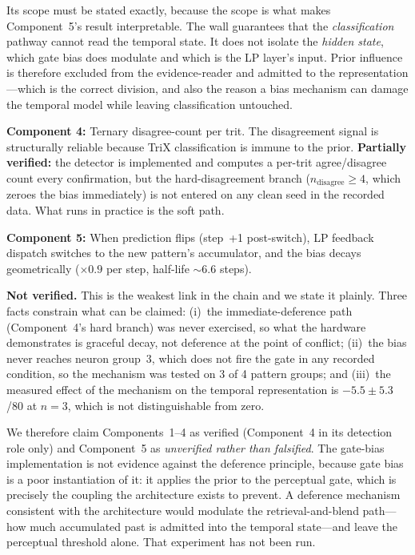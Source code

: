 \documentclass[11pt,letterpaper]{article}
\begin{document}
Its scope must be stated exactly, because the scope is what makes Component~5's result interpretable. The wall guarantees that the \emph{classification} pathway cannot read the temporal state. It does not isolate the \emph{hidden state}, which gate bias does modulate and which is the LP layer's input. Prior influence is therefore excluded from the evidence-reader and admitted to the representation---which is the correct division, and also the reason a bias mechanism can damage the temporal model while leaving classification untouched.

\textbf{Component 4:} Ternary disagree-count per trit. The disagreement signal is structurally reliable because TriX classification is immune to the prior. \textbf{Partially verified:} the detector is implemented and computes a per-trit agree/disagree count every confirmation, but the hard-disagreement branch ($n_{\text{disagree}} \ge 4$, which zeroes the bias immediately) is not entered on any clean seed in the recorded data. What runs in practice is the soft path.

\textbf{Component 5:} When prediction flips (step~+1 post-switch), LP feedback dispatch switches to the new pattern's accumulator, and the bias decays geometrically ($\times 0.9$ per step, half-life $\sim$6.6 steps).

\textbf{Not verified.} This is the weakest link in the chain and we state it plainly. Three facts constrain what can be claimed: (i)~the immediate-deference path (Component~4's hard branch) was never exercised, so what the hardware demonstrates is graceful decay, not deference at the point of conflict; (ii)~the bias never reaches neuron group~3, which does not fire the gate in any recorded condition, so the mechanism was tested on 3 of 4 pattern groups; and (iii)~the measured effect of the mechanism on the temporal representation is $-5.5 \pm 5.3$/80 at $n=3$, which is not distinguishable from zero.

We therefore claim Components~1--4 as verified (Component~4 in its detection role only) and Component~5 as \emph{unverified rather than falsified}. The gate-bias implementation is not evidence against the deference principle, because gate bias is a poor instantiation of it: it applies the prior to the perceptual gate, which is precisely the coupling the architecture exists to prevent. A deference mechanism consistent with the architecture would modulate the retrieval-and-blend path---how much accumulated past is admitted into the temporal state---and leave the perceptual threshold alone. That experiment has not been run.
\end{document}
